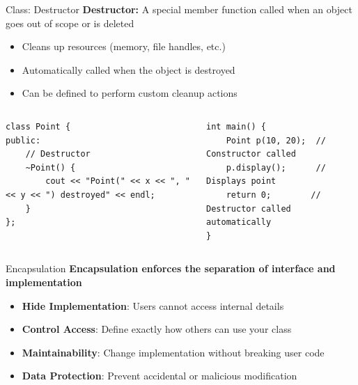 \begin{frame}[fragile]{Class: Destructor}
	\textbf{Destructor:} A special member function called when an object goes out of scope or is deleted
	\begin{itemize}
		\item Cleans up resources (memory, file handles, etc.)
		\item Automatically called when the object is destroyed
		\item Can be defined to perform custom cleanup actions
	\end{itemize}

	\begin{columns}
		\begin{column}{0.5\textwidth}
			\begin{verbatim}
class Point {
public:
    // Destructor
    ~Point() {
        cout << "Point(" << x << ", " << y << ") destroyed" << endl;
    }
};
        \end{verbatim}
		\end{column}
		\begin{column}{0.5\textwidth}
			\begin{verbatim}
int main() {
    Point p(10, 20);  // Constructor called
    p.display();      // Displays point
    return 0;        // Destructor called automatically
}
    \end{verbatim}
		\end{column}
	\end{columns}
\end{frame}



\begin{frame}[fragile]{Encapsulation}
	\textbf{Encapsulation enforces the separation of interface and implementation}
	\begin{itemize}
		\item \textbf{Hide Implementation}: Users cannot access internal details
		\item \textbf{Control Access}: Define exactly how others can use your class
		\item \textbf{Maintainability}: Change implementation without breaking user code
		\item \textbf{Data Protection}: Prevent accidental or malicious modification
	\end{itemize}

\end{frame}

